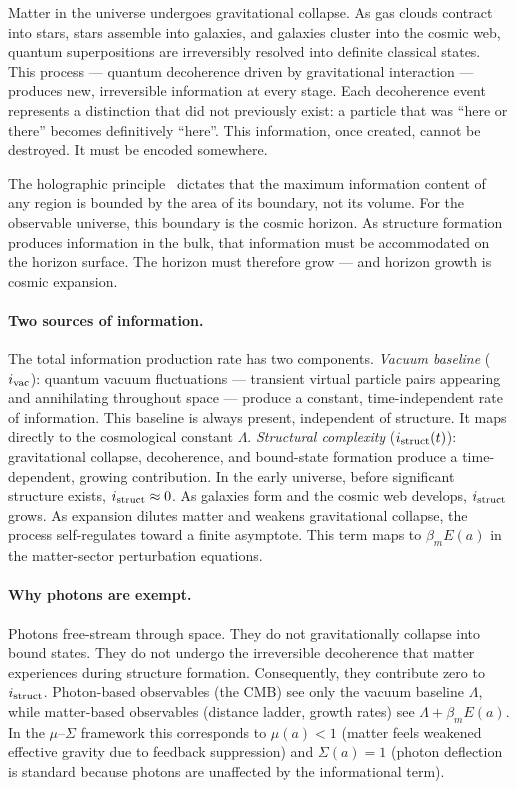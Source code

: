 Matter in the universe undergoes gravitational collapse. As gas clouds contract into stars, stars assemble into galaxies, and galaxies cluster into
the cosmic web, quantum superpositions are irreversibly resolved into definite classical states. This process --- quantum decoherence driven by
gravitational interaction --- produces new, irreversible information at every stage. Each decoherence event represents a distinction that did not
previously exist: a particle that was ``here or there'' becomes definitively ``here''. This information, once created, cannot be destroyed. It must be
encoded somewhere.

The holographic principle~\cite{tHooft1993,Susskind1995,Bousso2002} dictates that the maximum information content of any region is bounded by the area of its boundary, not its
volume. For the observable universe, this boundary is the cosmic horizon. As structure formation produces information in the bulk, that information
must be accommodated on the horizon surface. The horizon must therefore grow --- and horizon growth is cosmic expansion.

\paragraph{Two sources of information.} The total information production rate has two components.
\emph{Vacuum baseline} ($i_{\rm vac}$): quantum vacuum fluctuations --- transient virtual particle pairs appearing and annihilating throughout space ---
produce a constant, time-independent rate of information. This baseline is always present, independent of structure. It maps directly to the
cosmological constant $\Lambda$.
\emph{Structural complexity} ($i_{\rm struct}(t)$): gravitational collapse, decoherence, and bound-state formation produce a time-dependent, growing
contribution. In the early universe, before significant structure exists, $i_{\rm struct}\approx0$. As galaxies form and the cosmic web develops,
$i_{\rm struct}$ grows. As expansion dilutes matter and weakens gravitational collapse, the process self-regulates toward a finite asymptote. This term
maps to $\beta_mE(a)$ in the matter-sector perturbation equations. \conjecture

\paragraph{Why photons are exempt.} Photons free-stream through space. They do not gravitationally collapse into bound states. They do not undergo the
irreversible decoherence that matter experiences during structure formation. Consequently, they contribute zero to $i_{\rm struct}$. Photon-based
observables (the CMB) see only the vacuum baseline $\Lambda$, while matter-based observables (distance ladder, growth rates) see
$\Lambda+\beta_mE(a)$. In the $\mu$--$\Sigma$ framework this corresponds to $\mu(a)<1$ (matter feels weakened effective gravity due to feedback
suppression) and $\Sigma(a)=1$ (photon deflection is standard because photons are unaffected by the informational term).

